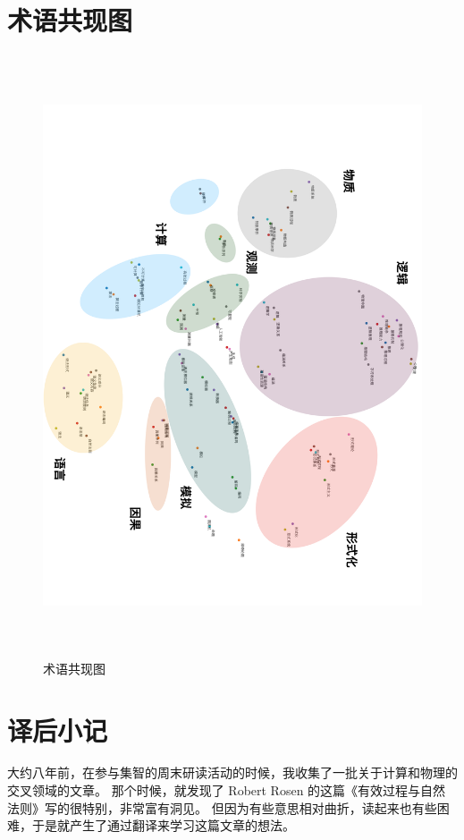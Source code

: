 \documentclass[a4paper,12pt]{article}
\begin{document}
\newpage
{}
{}



\newpage
{}
{}
\printindex
\printglossaries

\newpage
\appendix
\section{术语共现图}

\begin{figure}[ht]
\centering
\includegraphics[height=7in]{images/concepts.png}
\caption{术语共现图}
\end{figure}

\newpage
\section{译后小记}

大约八年前，在参与集智的周末研读活动的时候，我收集了一批关于计算和物理的交叉领域的文章。
那个时候，就发现了 Robert Rosen 的这篇《有效过程与自然法则》写的很特别，非常富有洞见。
但因为有些意思相对曲折，读起来也有些困难，于是就产生了通过翻译来学习这篇文章的想法。
\end{document}
